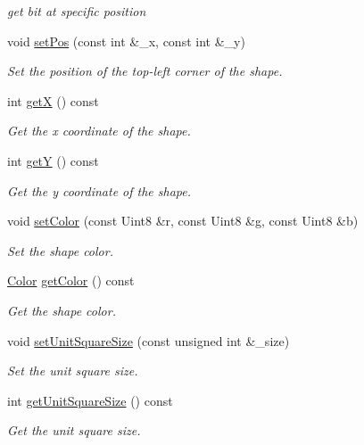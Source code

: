\begin{DoxyCompactItemize}
\begin{DoxyCompactList}\small\item\em get bit at specific position \end{DoxyCompactList}\item 
void \mbox{\hyperlink{class_shape_aa743a709f100d8e17b3bb577d4697480}{set\+Pos}} (const int \&\+\_\+x, const int \&\+\_\+y)
\begin{DoxyCompactList}\small\item\em Set the position of the top-\/left corner of the shape. \end{DoxyCompactList}\item 
int \mbox{\hyperlink{class_shape_af604de36aa616c585bb30dedf5e5c68b}{getX}} () const
\begin{DoxyCompactList}\small\item\em Get the x coordinate of the shape. \end{DoxyCompactList}\item 
int \mbox{\hyperlink{class_shape_a2e87ea4122381ffb83474f4b69247ded}{getY}} () const
\begin{DoxyCompactList}\small\item\em Get the y coordinate of the shape. \end{DoxyCompactList}\item 
void \mbox{\hyperlink{class_shape_a657c70819a01a52d56c68302f07ffad9}{set\+Color}} (const Uint8 \&r, const Uint8 \&g, const Uint8 \&b)
\begin{DoxyCompactList}\small\item\em Set the shape color. \end{DoxyCompactList}\item 
\mbox{\hyperlink{class_color}{Color}} \mbox{\hyperlink{class_shape_a6ab685fc0e6aeec5d2e9743f5ecd66a4}{get\+Color}} () const
\begin{DoxyCompactList}\small\item\em Get the shape color. \end{DoxyCompactList}\item 
void \mbox{\hyperlink{class_shape_a7891a1b03a0034b6a9f4c622902a071c}{set\+Unit\+Square\+Size}} (const unsigned int \&\+\_\+size)
\begin{DoxyCompactList}\small\item\em Set the unit square size. \end{DoxyCompactList}\item 
int \mbox{\hyperlink{class_shape_a85f4b751a60f6df5afdbfb5b530f6bc3}{get\+Unit\+Square\+Size}} () const
\begin{DoxyCompactList}\small\item\em Get the unit square size. \end{DoxyCompactList}\item 

\end{DoxyCompactItemize}
